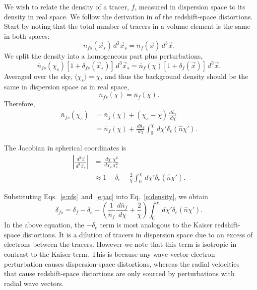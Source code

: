 \documentclass[twocolumn,nofootinbib,prl,floatfix]{revtex4-1}
\newcommand{\ud}{\,d}
\begin{document}
We wish to relate the density of a tracer, $f$, measured in dispersion space to its
density in real space. We follow the derivation in \citet{1987MNRAS.227....1K}
of the
redshift-space distortions. Start by noting that the total number of tracers
in a volume element is the same in both spaces:
\begin{equation}
n_{fs}(\vec x_s) \ud^3\vec x_s = n_{f}(\vec x) \ud^3\vec x.
\end{equation}
We split the density into a homogeneous part plus perturbations,
\begin{equation}
\label{e:density}
    \bar{n}_{fs}(\chi_s)\left[ 1 + \delta_{fs}(\vec x_s)\right] \ud^3\vec x_s
    = \bar{n}_{f}(\chi)\left[ 1 + \delta_f(\vec x)\right] \ud^3\vec x.
\end{equation}
Averaged over the sky, $\langle \chi_s \rangle = \chi$, and thus the background
density should
be the same in dispersion space as in real space,
\begin{equation}
\bar{n}_{fs}(\chi) = \bar{n}_f(\chi).
\end{equation}
Therefore,
\begin{align}
\bar{n}_{fs}(\chi_s) 
    &= \bar{n}_{f}(\chi) + (\chi_s - \chi)\frac{\ud \bar{n}_f}{\ud \chi}\\
    &= \bar{n}_{f}(\chi)
       + \frac{\ud \bar{n}_f}{\ud \chi}\int_0^\chi \ud \chi' \delta_e(\hat n
       \chi').
       \label{e:nfs}
\end{align}

The Jacobian in spherical coordinates is
\begin{align}
\left| \frac{\ud^3\vec x}{\ud^3\vec x_s} \right|
    &= \frac{\ud \chi}{\ud \chi_s}\frac{\chi^2}{\chi_s^2}\\
    &\approx 1 - \delta_e
        - \frac{2}{\chi}\int_0^\chi \ud \chi' \delta_e(\hat n \chi').
        \label{e:jac}
\end{align}

Substituting Eqs.~\ref{e:nfs}~and~\ref{e:jac} into Eq.~\ref{e:density},
we obtain
\begin{equation}
\label{e:delta_s}
    \delta_{fs} = \delta_f - \delta_e
    - \left(\frac{1}{\bar{n}_f}\frac{\ud \bar{n}_f}{\ud \chi}
    + \frac{2}{\chi} \right)
        \int_0^\chi \ud \chi' \delta_e(\hat n \chi').
\end{equation}
In the above equation, the $-\delta_e$ term is most analogous to the Kaiser
redshift-space distortions.  It is a dilution of tracers in dispersion space due to an
excess of electrons between the tracers. However we note that this term is isotropic
in contrast to the Kaiser term.  This is because any wave vector electron perturbation
causes dispersion-space distortions, whereas the radial velocities that cause
redshift-space distortions are only sourced by perturbations with radial wave
vectors.
\end{document}
